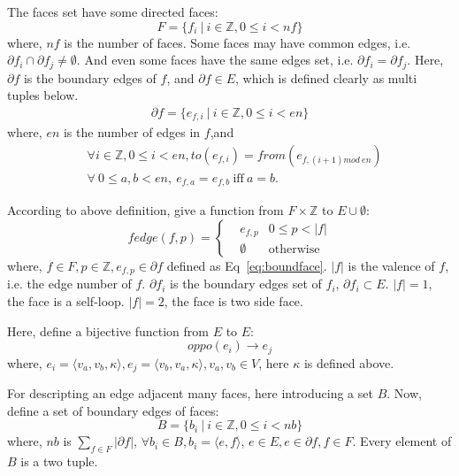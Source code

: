 \documentclass[9pt,twocolumn]{extarticle}
\begin{document}
The faces set have some directed faces:
\begin{equation}
F=\{ f_i \ |\ i\in \mathbb{Z}, 0\leq i < nf \}
\end{equation}
where, $nf$ is the number of faces. Some faces may have
common edges, i.e. $\partial f_i \cap \partial f_j \neq \emptyset$. 
And even some faces have the same edges set, i.e. $\partial f_i=\partial f_j$.
Here, $\partial f$ is the boundary edges of $f$, and $\partial f\in E$,
which is defined clearly as multi tuples below.
\begin{equation}
\begin{split}
\partial f = \{ e_{f,i}\ |\ i\in \mathbb{Z}, 0\leq i<en \}
\label{eq:boundface}
\end{split}
\end{equation}
where, $en$ is the number of edges in $f$,and
\begin{align}
&\forall i\in \mathbb{Z}, 0\leq i <en,to(e_{f,i})=from(e_{f,(i+1)mod\ en})\\
&\forall \ 0\leq a,b<en,\ e_{f,a}= e_{f,b}\ \mbox{iff}\ a=b.
\end{align}

According to above definition, give a function from $F\times \mathbb{Z}$ to $E\cup \emptyset$:
\begin{equation}
fedge(f,p)=\left\{
\begin{aligned}
&e_{f,p} &0\leq p<|f|\\
&\emptyset & \mbox{otherwise}
\end{aligned}\right.
\label{eq:fedge}
\end{equation}
where, $f\in F, p\in \mathbb{Z}, e_{f,p}\in \partial f$ defined as Eq~\ref{eq:boundface}.
$|f|$ is the valence of $f$, i.e. the edge number of $f$. 
$\partial f_i$ is the boundary edges set of $f_i$, $\partial f_i\subset E$.
$|f|=1$, the face is a self-loop. $|f|=2$, the face is two side face.

Here, define a bijective function from $E$ to $E$:
\begin{equation}
oppo(e_i) \rightarrow e_j
\end{equation}
where, $e_i=\langle v_a,v_b,\kappa\rangle, e_j=\langle v_b,v_a,\kappa\rangle, v_a,v_b\in V$, 
here $\kappa$ is defined above.

For descripting an edge adjacent many faces, here introducing a set $B$.
Now, define a set of boundary edges of faces:
\begin{equation}
B = \{ b_i\ |\ i\in \mathbb{Z}, 0\leq i<nb\}
\end{equation}
where, $nb$ is $\sum_{f\in F}|\partial f|$, $\forall b_i\in B, b_i=\langle e,f \rangle$, 
$e\in E, e\in \partial f, f\in F$. Every element of $B$ is a two tuple.
\end{document}
